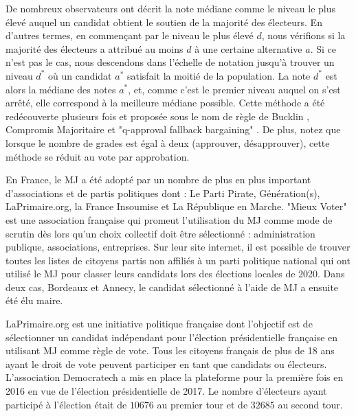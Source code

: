 	De nombreux observateurs ont décrit la note médiane comme le niveau le plus élevé auquel un candidat obtient le soutien de la majorité des électeurs. En d'autres termes, en commençant par le niveau le plus élevé $d$, nous vérifions si la majorité des électeurs a attribué au moins $d$ à une certaine alternative $a$. Si ce n'est pas le cas, nous descendons dans l'échelle de notation jusqu'à trouver un niveau $d^*$ où un candidat $a^*$ satisfait la moitié de la population. La note $d^*$ est alors la médiane des notes $a^*$, et, comme c'est le premier niveau auquel on s'est arrêté, elle correspond à la meilleure médiane possible. Cette méthode a été redécouverte plusieurs fois et proposée sous le nom de règle de Bucklin \citep{Hoag1926}, Compromis Majoritaire \citep{Sertel1986,Sertel1999} et "q-approval fallback bargaining" \citep{Brams2001}. De plus, notez que lorsque le nombre de grades est égal à deux (approuver, désapprouver), cette méthode se réduit au vote par approbation.
	
	En France, le \ac{MJ} a été adopté par un nombre de plus en plus important d'associations et de partis politiques dont : Le Parti Pirate, Génération(s), LaPrimaire.org, la France Insoumise et La République en Marche.
	"Mieux Voter" \citep{MV} est une association française qui promeut l'utilisation du \ac{MJ} comme mode de scrutin dès lors qu'un choix collectif doit être sélectionné : administration publique, associations, entreprises. Sur leur site internet, il est possible de trouver toutes les listes de citoyens \textendash partis non affiliés à un parti politique national \textemdash qui ont utilisé le \ac{MJ} pour classer leurs candidats lors des élections locales de 2020. Dans deux cas, Bordeaux et Annecy, le candidat sélectionné à l'aide de \ac{MJ} a ensuite été élu maire. 
	
	LaPrimaire.org \citep{LaPrimaire} est une initiative politique française dont l'objectif est de sélectionner un candidat indépendant pour l'élection présidentielle française en utilisant \ac{MJ} comme règle de vote. Tous les citoyens français de plus de 18 ans ayant le droit de vote peuvent participer en tant que candidats ou électeurs. L'association Democratech a mis en place la plateforme pour la première fois en 2016 en vue de l'élection présidentielle de 2017. Le nombre d'électeurs ayant participé à l'élection était de $10676$ au premier tour et de $32685$ au second tour.
	
